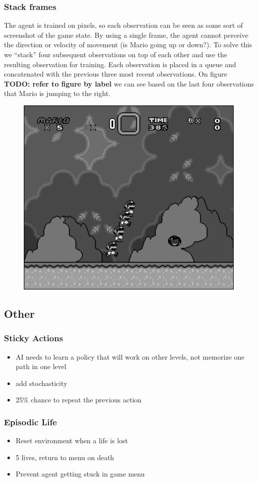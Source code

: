 \documentclass{article}
\begin{document}
    \subsubsection{Stack frames}
    The agent is trained on pixels, so each observation can be seen as some sort of screenshot of the game state.
    By using a single frame, the agent cannot perceive the direction or velocity of movement (is Mario going up or down?).
    To solve this we ``stack'' four subsequent observations on top of each other and use the resulting observation for training.
    Each observation is placed in a queue and concatenated with the previous three most recent observations.
    On figure \textbf{TODO: refer to figure by label} we can see based on the last four observations that Mario is jumping to the right.
    \begin{figure}[H]
        \centering
        \includegraphics[width=.6\textwidth]{stacked}
    \end{figure}
    \subsection{Other}
    \subsubsection{Sticky Actions}
    \begin{itemize}
        \item AI needs to learn a policy that will work on other levels, not memorize one path in one level
        \item add stochasticity
        \item 25\% chance to repeat the previous action
    \end{itemize}
    \subsubsection{Episodic Life}
    \begin{itemize}
        \item Reset environment when a life is lost
        \item 5 lives, return to menu on death
        \item Prevent agent getting stuck in game menu
    \end{itemize}
\end{document}
